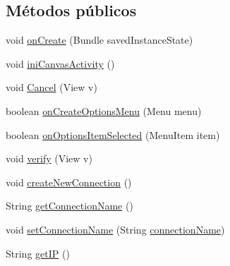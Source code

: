 \subsection*{Métodos públicos}
\begin{DoxyCompactItemize}
\item 
void \hyperlink{classes_1_1ucm_1_1tfg_1_1controlremotolinux_1_1client_1_1controller_1_1NewConnectionActivity_aa18650c8e7db7ca476529d40f1904bfd}{on\-Create} (Bundle saved\-Instance\-State)
\item 
void \hyperlink{classes_1_1ucm_1_1tfg_1_1controlremotolinux_1_1client_1_1controller_1_1NewConnectionActivity_af58815772336a22f531303604ecd4836}{ini\-Canvas\-Activity} ()
\item 
void \hyperlink{classes_1_1ucm_1_1tfg_1_1controlremotolinux_1_1client_1_1controller_1_1NewConnectionActivity_ad098162cf9ce53b7964cc7887a534789}{Cancel} (View v)
\item 
boolean \hyperlink{classes_1_1ucm_1_1tfg_1_1controlremotolinux_1_1client_1_1controller_1_1NewConnectionActivity_a6f517587d92b1d8dbf3399a1a1c6323b}{on\-Create\-Options\-Menu} (Menu menu)
\item 
boolean \hyperlink{classes_1_1ucm_1_1tfg_1_1controlremotolinux_1_1client_1_1controller_1_1NewConnectionActivity_a6f04e3e94c22830f934973292617905c}{on\-Options\-Item\-Selected} (Menu\-Item item)
\item 
void \hyperlink{classes_1_1ucm_1_1tfg_1_1controlremotolinux_1_1client_1_1controller_1_1NewConnectionActivity_afbf0d3530f81865670497f3436e734f7}{verify} (View v)
\item 
void \hyperlink{classes_1_1ucm_1_1tfg_1_1controlremotolinux_1_1client_1_1controller_1_1NewConnectionActivity_a70d371e8ebc5f21c614ab28f7c1d3eb9}{create\-New\-Connection} ()
\item 
String \hyperlink{classes_1_1ucm_1_1tfg_1_1controlremotolinux_1_1client_1_1controller_1_1NewConnectionActivity_aceea46084a1bf9380f877d839f02f47e}{get\-Connection\-Name} ()
\item 
void \hyperlink{classes_1_1ucm_1_1tfg_1_1controlremotolinux_1_1client_1_1controller_1_1NewConnectionActivity_acfcd352f7a12ad64c2d7672ec65e574a}{set\-Connection\-Name} (String \hyperlink{classes_1_1ucm_1_1tfg_1_1controlremotolinux_1_1client_1_1controller_1_1NewConnectionActivity_a3f3c0694b43f637393da1de941c00fa1}{connection\-Name})
\item 
String \hyperlink{classes_1_1ucm_1_1tfg_1_1controlremotolinux_1_1client_1_1controller_1_1NewConnectionActivity_ac3eb6f78025b6508cc2b4d1049b8a56e}{get\-I\-P} ()

\end{DoxyCompactItemize}
